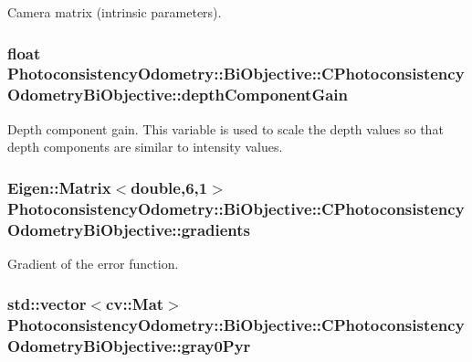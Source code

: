 Camera matrix (intrinsic parameters). \hypertarget{class_photoconsistency_odometry_1_1_bi_objective_1_1_c_photoconsistency_odometry_bi_objective_a36e4db1f8ff290be6b443d863975b7ab}{
\subsubsection[{depthComponentGain}]{\setlength{\rightskip}{0pt plus 5cm}float {\bf PhotoconsistencyOdometry::BiObjective::CPhotoconsistencyOdometryBiObjective::depthComponentGain}}}
\label{class_photoconsistency_odometry_1_1_bi_objective_1_1_c_photoconsistency_odometry_bi_objective_a36e4db1f8ff290be6b443d863975b7ab}
Depth component gain. This variable is used to scale the depth values so that depth components are similar to intensity values. \hypertarget{class_photoconsistency_odometry_1_1_bi_objective_1_1_c_photoconsistency_odometry_bi_objective_afc7ba59ecbc66587a6962da3e9ed7db3}{
\subsubsection[{gradients}]{\setlength{\rightskip}{0pt plus 5cm}Eigen::Matrix$<$double,6,1$>$ {\bf PhotoconsistencyOdometry::BiObjective::CPhotoconsistencyOdometryBiObjective::gradients}}}
\label{class_photoconsistency_odometry_1_1_bi_objective_1_1_c_photoconsistency_odometry_bi_objective_afc7ba59ecbc66587a6962da3e9ed7db3}
Gradient of the error function. \hypertarget{class_photoconsistency_odometry_1_1_bi_objective_1_1_c_photoconsistency_odometry_bi_objective_a5b6c425d383f581b45ca8865972a37b7}{
\subsubsection[{gray0Pyr}]{\setlength{\rightskip}{0pt plus 5cm}std::vector$<$cv::Mat$>$ {\bf PhotoconsistencyOdometry::BiObjective::CPhotoconsistencyOdometryBiObjective::gray0Pyr}}}
